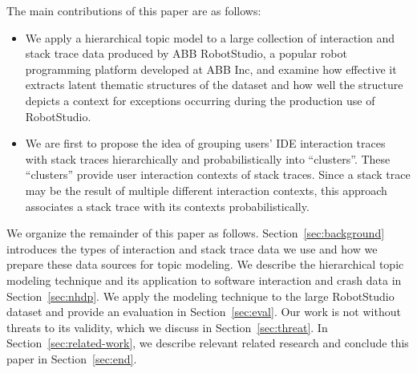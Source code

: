 The main contributions of this paper are as follows:
\begin{itemize}
    \item We apply a hierarchical topic model to a large collection of
      interaction and stack trace data produced by ABB RobotStudio, a popular
      robot programming platform developed at ABB Inc, and examine how
      effective it extracts latent thematic structures of the dataset and how
      well the structure depicts a context for exceptions occurring
      during the production use of RobotStudio. 

    \item We are first to propose the idea of grouping users' IDE interaction traces with
        stack traces hierarchically and probabilistically into ``clusters''.
        These ``clusters'' provide user interaction contexts of stack traces.  Since a
        stack trace may be the result of multiple different interaction contexts, this
        approach associates a stack trace with its contexts probabilistically. 

\end{itemize}

We organize the remainder of this paper as follows.
Section~\ref{sec:background} introduces the types of interaction and stack
trace data we use and how we prepare these data sources for topic modeling. We
describe the hierarchical topic modeling technique and its application to
software interaction and crash data in Section~\ref{sec:nhdp}. We apply the
modeling technique to the large RobotStudio dataset and provide an evaluation
in Section~\ref{sec:eval}. Our work is not without threats to its validity, which we discuss in
Section~\ref{sec:threat}. In
Section~\ref{sec:related-work}, we describe relevant related research and
conclude this paper in Section~\ref{sec:end}.
